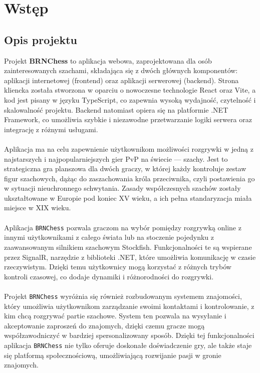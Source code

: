 \documentclass[12pt,a4paper]{article}
\begin{document}
\newpage

\tableofcontents

\newpage

\section{Wstęp}
\subsection{Opis projektu}

Projekt \textbf{BRNChess} to aplikacja webowa, zaprojektowana dla osób zainteresowanych szachami, składająca się z dwóch głównych komponentów: aplikacji internetowej (frontend) oraz aplikacji serwerowej (backend). Strona kliencka została stworzona w oparciu o nowoczesne technologie React oraz Vite, a kod jest pisany w języku TypeScript, co zapewnia wysoką wydajność, czytelność i skalowalność projektu. Backend natomiast opiera się na platformie .NET Framework, co umożliwia szybkie i niezawodne przetwarzanie logiki serwera oraz integrację z różnymi usługami.
\\\\
Aplikacja ma na celu zapewnienie użytkownikom możliwości rozgrywki w jedną z najstarszych i najpopularniejszych gier PvP na świecie — szachy. Jest to strategiczna gra planszowa dla dwóch graczy, w której każdy kontroluje zestaw figur szachowych, dążąc do zaszachowania króla przeciwnika, czyli postawienia go w sytuacji nieuchronnego schwytania. Zasady współczesnych szachów zostały ukształtowane w Europie pod koniec XV wieku, a ich pełna standaryzacja miała miejsce w XIX wieku.
\\\\
Aplikacja \texttt{BRNChess} pozwala graczom na wybór pomiędzy rozgrywką online z innymi użytkownikami z całego świata lub na stoczenie pojedynku z zaawansowanym silnikiem szachowym Stockfish. Funkcjonalności te są wspierane przez SignalR, narzędzie z biblioteki .NET, które umożliwia komunikację w czasie rzeczywistym. Dzięki temu użytkownicy mogą korzystać z różnych trybów kontroli czasowej, co dodaje dynamiki i różnorodności do rozgrywki.
\\\\
Projekt \texttt{BRNChess} wyróżnia się również rozbudowanym systemem znajomości, który umożliwia użytkownikom zarządzanie swoimi kontaktami i kontrolowanie, z kim chcą rozgrywać partie szachowe. System ten pozwala na wysyłanie i akceptowanie zaproszeń do znajomych, dzięki czemu gracze mogą współzawodniczyć w bardziej spersonalizowany sposób. Dzięki tej funkcjonalności aplikacja \texttt{BRNChess} nie tylko oferuje doskonałe doświadczenie gry, ale także staje się platformą społecznościową, umożliwiającą rozwijanie pasji w gronie znajomych.
\end{document}
